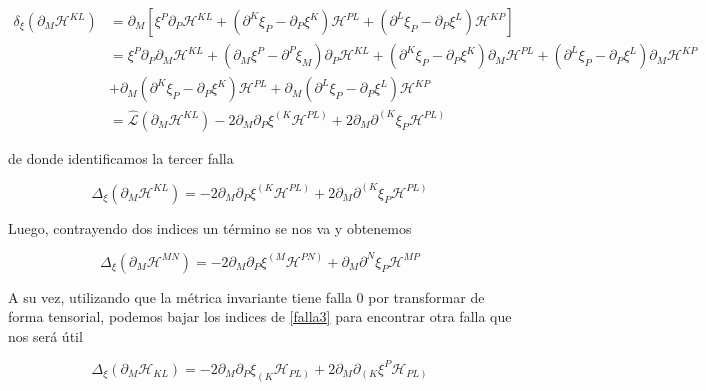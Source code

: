 \documentclass{article}
\numberwithin{equation}{section}
\begin{document}
\begin{equation}\label{key}
\begin{aligned}
\delta_{\xi} \left( \partial_M \mathcal{H}^{KL}\right) &= \partial_M \left[ \xi^P\partial_P \mathcal{H}^{KL} + \left(\partial^K \xi_P - \partial_P\xi^K\right)\mathcal{H}^{PL} + \left(\partial^L \xi_P - \partial_P\xi^L\right)\mathcal{H}^{KP} \right]\\
&= \xi^P\partial_P \partial_M \mathcal{H}^{KL} + \left( \partial_M \xi^P - \partial^P \xi_M \right)\partial_P \mathcal{H}^{KL} +  \left(\partial^K \xi_P - \partial_P\xi^K\right)\partial_M\mathcal{H}^{PL} + \left(\partial^L \xi_P - \partial_P\xi^L\right)\partial_M\mathcal{H}^{KP}\\
&+ \partial_M\left(\partial^K \xi_P - \partial_P\xi^K\right)\mathcal{H}^{PL} + \partial_M \left(\partial^L \xi_P - \partial_P\xi^L\right)\mathcal{H}^{KP}\\
&= \hat{\mathcal{L}}\left( \partial_M \mathcal{H}^{KL} \right) - 2\partial_M \partial_P \xi^{\left(K\right.} \mathcal{H}^{\left.PL\right)} + 2\partial_M \partial^{\left(K\right.}\xi_P \mathcal{H}^{\left.PL\right)} 
\end{aligned}
\end{equation}

de donde identificamos la tercer falla

\begin{equation}\label{falla3}
\Delta_{\xi} \left( \partial_M \mathcal{H}^{KL}\right) = - 2\partial_M \partial_P \xi^{\left(K\right.} \mathcal{H}^{\left.PL\right)} + 2\partial_M \partial^{\left(K\right.}\xi_P \mathcal{H}^{\left.PL\right)} 
\end{equation}

Luego, contrayendo dos indices un término se nos va y obtenemos

\begin{equation}\label{falla4}
\Delta_{\xi} \left( \partial_M \mathcal{H}^{MN}\right) = - 2\partial_M \partial_P \xi^{\left(M\right.} \mathcal{H}^{\left.PN\right)} + \partial_M \partial^{N}\xi_P \mathcal{H}^{MP}
\end{equation}



A su vez, utilizando que la métrica invariante tiene falla 0 por transformar de forma tensorial, podemos bajar los indices de \ref{falla3} para encontrar otra falla que nos será útil

\begin{equation}\label{falla5}
\Delta_{\xi} \left( \partial_M \mathcal{H}_{KL}\right) = - 2\partial_M \partial_P \xi_{\left(K\right.} \mathcal{H}_{\left.PL\right)} + 2\partial_M \partial_{\left(K\right.}\xi^P \mathcal{H}_{\left.PL\right)} 
\end{equation}
\end{document}
